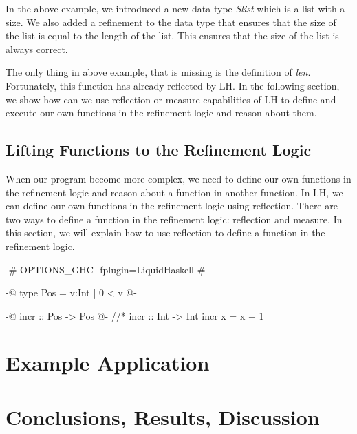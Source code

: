 \documentclass[]{rptuseminar}
\begin{document}
In the above example, we introduced a new data type \textit{Slist} which is a list with a size. 
We also added a refinement to the data type that ensures that the size of the list is equal to the length of the list. 
This ensures that the size of the list is always correct.

The only thing in above example, that is missing is the definition of \textit{len}. Fortunately, this function has already reflected by
LH. In the following section, we show how can we use reflection or measure capabilities of LH to define and execute our own functions in the refinement logic and
reason about them.

\subsection{Lifting Functions to the Refinement Logic}
When our program become more complex, we need to define our own functions in the refinement logic and reason about
a function in another function. In LH, we can define our own functions in the refinement logic using reflection.
There are two ways to define a function in the refinement logic: reflection and measure. In this section, we will explain how to use reflection to define a function in the refinement logic.
\begin{haskell}

\end{haskell}

\begin{haskell}
 {-# OPTIONS_GHC -fplugin=LiquidHaskell #-}

 {-@ type Pos = {v:Int | 0 < v} @-}

 {-@ incr :: Pos -> Pos @-} //*\label{srcline:typerefinement}
 incr :: Int -> Int
 incr x = x + 1 
\end{haskell}
\section{Example Application}
\label{sec:example}

\section{Conclusions, Results, Discussion}
\label{sec:conclusions}

\newpage
\nocite{*}



\end{document}

